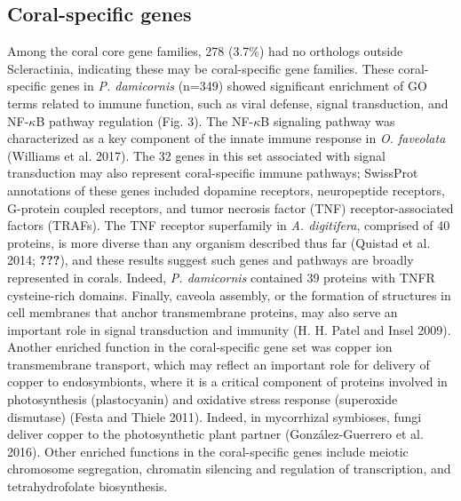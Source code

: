 \documentclass[]{elsarticle} %
\begin{document}
\subsection{Coral-specific genes}\label{coral-specific-genes}

Among the coral core gene families, 278 (3.7\%) had no orthologs outside
Scleractinia, indicating these may be coral-specific gene families.
These coral-specific genes in \emph{P. damicornis} (n=349) showed
significant enrichment of GO terms related to immune function, such as
viral defense, signal transduction, and NF-\(\kappa\)B pathway
regulation (Fig. 3). The NF-\(\kappa\)B signaling pathway was
characterized as a key component of the innate immune response in
\emph{O. faveolata} (Williams et al. 2017). The 32 genes in this set
associated with signal transduction may also represent coral-specific
immune pathways; SwissProt annotations of these genes included dopamine
receptors, neuropeptide receptors, G-protein coupled receptors, and
tumor necrosis factor (TNF) receptor-associated factors (TRAFs). The TNF
receptor superfamily in \emph{A. digitifera}, comprised of 40 proteins,
is more diverse than any organism described thus far (Quistad et al.
2014; {\textbf{???}}), and these results suggest such genes and pathways
are broadly represented in corals. Indeed, \emph{P. damicornis}
contained 39 proteins with TNFR cysteine-rich domains. Finally, caveola
assembly, or the formation of structures in cell membranes that anchor
transmembrane proteins, may also serve an important role in signal
transduction and immunity (H. H. Patel and Insel 2009). Another enriched
function in the coral-specific gene set was copper ion transmembrane
transport, which may reflect an important role for delivery of copper to
endosymbionts, where it is a critical component of proteins involved in
photosynthesis (plastocyanin) and oxidative stress response (superoxide
dismutase) (Festa and Thiele 2011). Indeed, in mycorrhizal symbioses,
fungi deliver copper to the photosynthetic plant partner
(González-Guerrero et al. 2016). Other enriched functions in the
coral-specific genes include meiotic chromosome segregation, chromatin
silencing and regulation of transcription, and tetrahydrofolate
biosynthesis.
\end{document}
